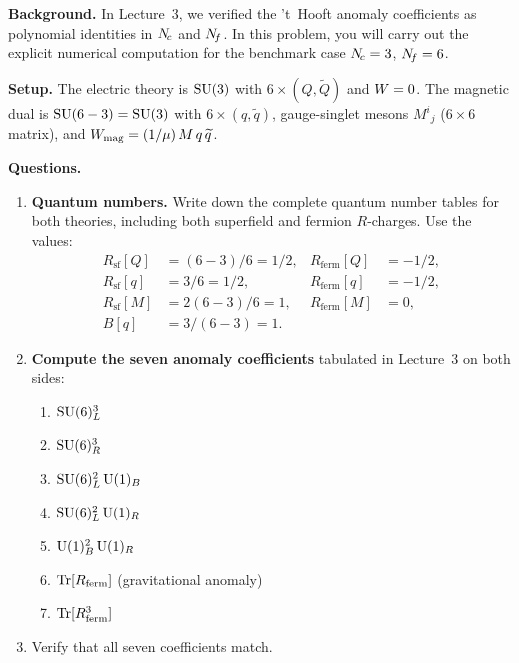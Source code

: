 \documentclass[11pt,a4paper]{article}
\begin{document}
\noindent\textbf{Background.}
In Lecture~3, we verified the 't~Hooft anomaly coefficients as
polynomial identities in $N_{\!c}$ and $N_{\!f}$.  In this
problem, you will carry out the explicit numerical computation for the
benchmark case $N_{\!c} = 3$, $N_{\!f} = 6$.

\medskip

\noindent\textbf{Setup.}  The electric theory is $\mathrm{SU}(3)$ with
$6 \times (Q, \widetilde{Q})$ and $W = 0$.  The magnetic dual
is $\mathrm{SU}(6 - 3) = \mathrm{SU}(3)$ with $6 \times (q, \widetilde{q})$,
gauge-singlet mesons $M^i{}_j$ ($6 \times 6$ matrix), and
$W_{\mathrm{mag}} = (1/\mu)\, M\, q\, \widetilde{q}$.

\medskip

\noindent\textbf{Questions.}
\begin{enumerate}[label=(\alph*)]
  \item \textbf{Quantum numbers.}  Write down the complete quantum number
    tables for both theories, including both superfield and fermion
    $R$-charges.  Use the values:
    \begin{align*}
      R_{\mathrm{sf}}[Q] &= (6-3)/6 = 1/2, &
      R_{\mathrm{ferm}}[Q] &= -1/2, \\
      R_{\mathrm{sf}}[q] &= 3/6 = 1/2, &
      R_{\mathrm{ferm}}[q] &= -1/2, \\
      R_{\mathrm{sf}}[M] &= 2(6-3)/6 = 1, &
      R_{\mathrm{ferm}}[M] &= 0, \\
      B[q] &= 3/(6-3) = 1. &
    \end{align*}

  \item \textbf{Compute the seven anomaly coefficients} tabulated in
    Lecture~3 on both sides:
    \begin{enumerate}[label=(\roman*)]
      \item $\mathrm{SU}(6)_L^3$
      \item $\mathrm{SU}(6)_R^3$
      \item $\mathrm{SU}(6)_L^2\,\mathrm{U}(1)_B$
      \item $\mathrm{SU}(6)_L^2\,\mathrm{U}(1)_R$
      \item $\mathrm{U}(1)_B^2\,\mathrm{U}(1)_R$
      \item $\mathrm{Tr}[R_{\mathrm{ferm}}]$ (gravitational anomaly)
      \item $\mathrm{Tr}[R_{\mathrm{ferm}}^3]$
    \end{enumerate}

  \item Verify that all seven coefficients match.
\end{enumerate}
\end{document}
